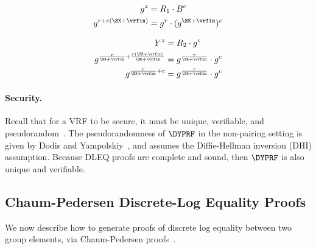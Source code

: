 \begin{align}
  \label{eq:correct-one}
  \begin{split}
    g^z &= R_1 \cdot B^c \\
    g^{r + c(\SK + \vrfin)}  &= g^r \cdot (g^{\SK + \vrfin})^c
  \end{split}
\end{align}

\begin{align}
  \label{eq:correct-two}
  \begin{split}
    Y^z &= R_2 \cdot g^c \\
    g^{\frac{r}{\SK + \vrfin} + \frac{c(\SK + \vrfin)}{\SK + \vrfin}}  &= g^\frac{r}{\SK + \vrfin} \cdot g^c \\
    g^{\frac{r}{\SK + \vrfin} + c}  &= g^\frac{r}{\SK + \vrfin} \cdot g^c
  \end{split}
\end{align}

\paragraph{Security.}
Recall that for a VRF to be secure,
it must be unique, verifiable, and pseudorandom~\cite{DodisY05}.
The pseudorandomness of $\DYPRF$ in the non-pairing setting is given by Dodis and Yampolskiy~\cite{DodisY05},
and assumes the Diffie-Hellman inversion (DHI) assumption.
Because DLEQ proofs are complete and sound,
then $\DYPRF$ is also unique and verifiable.

\subsection{Chaum-Pedersen Discrete-Log Equality Proofs}
\label{sec:dleq}

We now describe how to generate proofs of discrete log equality between two
group elements,
via Chaum-Pedersen proofs~\cite{BonehS2020}.

